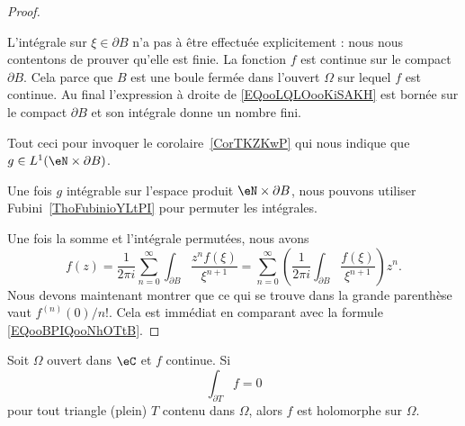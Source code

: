 \begin{proof}
\begin{subproof}
		L'intégrale sur \( \xi\in \partial B\) n'a pas à être effectuée explicitement : nous nous contentons de prouver qu'elle est finie.
		La fonction \( f\) est continue sur le compact \( \partial B\). Cela parce que \( B\) est une boule fermée dans l'ouvert \( \Omega\) sur lequel \( f\) est continue. Au final l'expression à droite de \eqref{EQooLQLOooKiSAKH} est bornée sur le compact \( \partial B\) et son intégrale donne un nombre fini.

		Tout ceci pour invoquer le corolaire~\ref{CorTKZKwP} qui nous indique que \( g\in L^1(\eN\times \partial B)\).

		Une fois \( g\) intégrable sur l'espace produit \( \eN\times \partial B\), nous pouvons utiliser Fubini~\ref{ThoFubinioYLtPI} pour permuter les intégrales.
	\end{subproof}

	Une fois la somme et l'intégrale permutées, nous avons
	\begin{equation} \label{EqXSgZGw}
		f(z)=\frac{1}{ 2\pi i }\sum_{n=0}^{\infty}\int_{\partial B}\frac{ z^nf(\xi) }{ \xi^{n+1} }
		=\sum_{n=0}^{\infty}\left( \frac{1}{ 2\pi i }\int_{\partial B}\frac{ f(\xi) }{ \xi^{n+1} } \right)z^n.
	\end{equation}
	Nous devons maintenant montrer que ce qui se trouve dans la grande parenthèse vaut \( f^{(n)}(0)/n!\). Cela est immédiat en comparant avec la formule \eqref{EQooBPIQooNhOTtB}.

\end{proof}

\begin{proposition}   \label{ThoRckxes}
	Soit \( \Omega\) ouvert dans \( \eC\) et \( f\) continue. Si
	\begin{equation}
		\int_{\partial T}f=0
	\end{equation}
	pour tout triangle (plein) \( T\) contenu dans \( \Omega\), alors \( f\) est holomorphe sur \( \Omega\).
\end{proposition}

